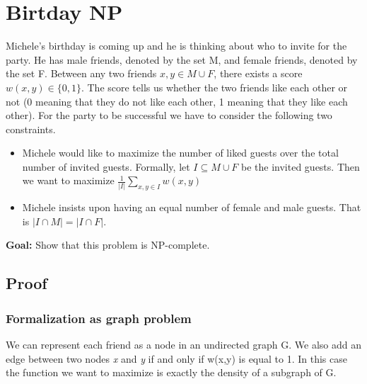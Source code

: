 \section{Birtday NP}
Michele's birthday is coming up and he is thinking about who to invite for the party. He has male friends, denoted by the set M, and female friends, denoted by the set F.
Between any two friends $x, y \in M \cup F$, there exists a score $w(x, y) \in \{0, 1\}$. The score tells us whether the two friends like each other or not (0 meaning that they do not like each other, 1 meaning that they like each other). For the party to be successful we have to consider the
following two constraints.
\begin{itemize}
	\item Michele would like to maximize the number of liked guests over the total number of
	invited guests. Formally, let $I \subseteq M \cup F$ be the invited guests. Then we want to maximize
	$\frac{1}{|I|} \sum_{x,y \in I} w(x,y)$
	\item Michele insists upon having an equal number of female and male guests. That is $|I \cap M| =
	|I \cap F|$.
\end{itemize}
\textbf{Goal:} Show that this problem is NP-complete.

\subsection{Proof}
\subsubsection{Formalization as graph problem}
We can represent each friend as a node in an undirected graph G. We also add an edge between two nodes \textit{x} and \textit{y} if and only if w(x,y) is equal to 1. In this case the function we want to maximize is exactly the density of a subgraph of G.

